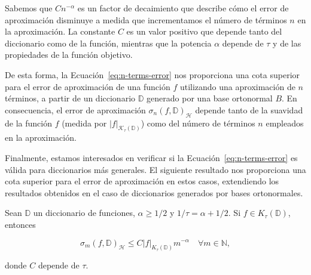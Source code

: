 Sabemos que $Cn^{-\alpha}$ es un factor de decaimiento que describe cómo el error de aproximación disminuye a medida que incrementamos el número de términos $n$ en la aproximación. La constante $C$ es un valor positivo que depende tanto del diccionario como de la función, mientras que la potencia $\alpha$ depende de $\tau$ y de las propiedades de la función objetivo.\newline

De esta forma, la Ecuación~\eqref{eq:n-terms-error} nos proporciona una cota superior para el error de aproximación de una función $f$ utilizando una aproximación de $n$ términos, a partir de un diccionario $\mathbb{D}$ generado por una base ortonormal $B$. En consecuencia, el error de aproximación $\sigma_n(f, \mathbb{D})_{\mathcal{H}}$ depende tanto de la suavidad de la función $f$ (medida por $|f|_{\mathcal{K}_{\tau}(\mathbb{D})}$) como del número de términos $n$ empleados en la aproximación.\newline

Finalmente, estamos interesados en verificar si la Ecuación~\eqref{eq:n-terms-error} es válida para diccionarios más generales. El siguiente resultado nos proporciona una cota superior para el error de aproximación en estos casos, extendiendo los resultados obtenidos en el caso de diccionarios generados por bases ortonormales.

\begin{teorema}
    Sean $\mathbb{D}$ un diccionario de funciones, $\alpha \geq 1/2$ y $1/\tau = \alpha + 1/2$. Si $f \in K_{\tau}(\mathbb{D})$, entonces

    \begin{equation}\label{eq:n-terms-teo}
        \sigma_m(f, \mathbb{D})_{\mathcal{H}} \leq C |f|_{K_{\tau}(\mathbb{D})} m^{-\alpha} \quad \forall m \in \mathbb{N},
    \end{equation}

    donde $C$ depende de $\tau$.
\end{teorema}


